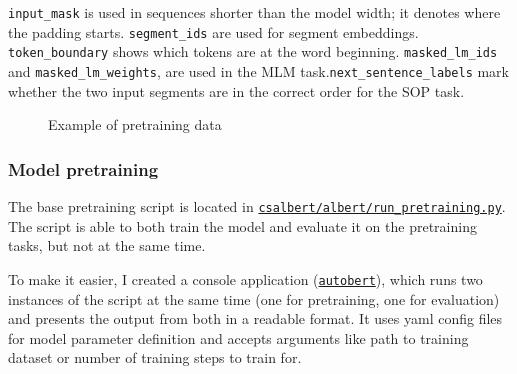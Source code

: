 \documentclass[
  printed, %
  color,   %
  table,   %
  oneside, %
  lof,     %
  lot,     %
]{fithesis3}
\begin{document}
\texttt{input\_mask} is used in sequences shorter than the model width; it denotes where the padding starts. \texttt{segment\_ids} are used for segment embeddings. \texttt{token\_boundary} shows which tokens are at the word beginning. \texttt{masked\_lm\_ids} and \texttt{masked\_lm\_weights}, are used in the MLM task.\texttt{next\_sentence\_labels} mark whether the two input segments are in the correct order for the SOP task.


\begin{figure}[h]
    \caption{Example of pretraining data}
    \label{fig:pretraining-data}
    \centering
\end{figure}



\subsubsection{Model pretraining}

The base pretraining script is located in
\href{https://github.com/ZepZep/csalbert/blob/master/albert/run_pretraining.py} {\texttt{csalbert/albert/run\_\linebreak{}pretraining.py}}. The script is able to both train the model and evaluate it on the pretraining tasks, but not at the same time.

To make it easier, I created a console application (\href{https://github.com/ZepZep/csalbert/blob/master/pretraining/autobert.py}{\texttt{autobert}}), which runs two instances of the script at the same time (one for pretraining, one for evaluation) and presents the output from both in a readable format. It uses yaml config files for model parameter definition and accepts arguments like path to training dataset or number of training steps to train for.
\end{document}
